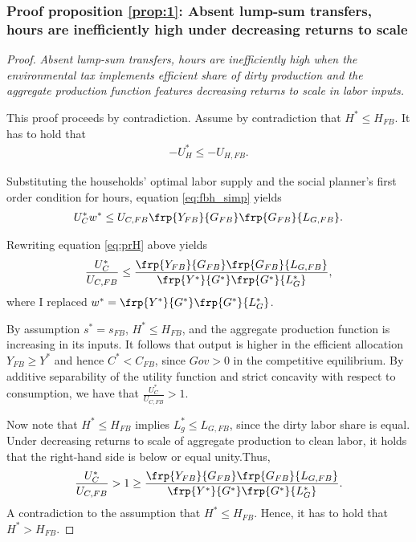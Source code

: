 \subsubsection{Proof proposition \ref{prop:1}: Absent lump-sum transfers, hours are inefficiently high under decreasing returns to scale}\label{app:nolumpsum_hourshigh}
\begin{proof}\textit{Absent lump-sum transfers, hours are inefficiently high when the environmental tax implements efficient share of dirty production and the aggregate production function features decreasing returns to scale in labor inputs.}
	
	This proof proceeds by contradiction. 
	Assume by contradiction that $H^*\leq H_{FB}$. 
	It has to hold that 
	\begin{align}
	-U_H^*\leq -U_{H,FB}.
	\end{align} 
	
	Substituting the households' optimal labor supply and the social planner's first order condition for hours, equation \ref{eq:fbh_simp} yields
	\begin{align}\label{eq:prH}
	U_C^*w^* \leq U_{C,FB}\frp{Y_{FB}}{G_{FB}}\frp{G_{FB}}{L_{G,FB}}.
	\end{align}
	
	Rewriting equation \ref{eq:prH} above yields
	\begin{align}
	\frac{U_C^*}{U_{C,FB}}\leq \frac{\frp{Y_{FB}}{G_{FB}}\frp{G_{FB}}{L_{G,FB}}}{\frp{Y^*}{G^*}\frp{G^*}{L^*_{G}}},
	\end{align}
	where I replaced $w^*=\frp{Y^*}{G^*}\frp{G^*}{L^*_{G}}$.
	
	By assumption $s^*=s_{FB}$, $H^*\leq H_{FB}$, and the aggregate production function is increasing in its inputs. It follows that output is higher in the efficient allocation $Y_{FB}\geq Y^*$ and hence $C^*<C_{FB}$, since $Gov>0$ in the competitive equilibrium. By additive separability of the utility function and strict concavity with respect to consumption, we have that $\frac{U_C^*}{U_{C,FB}}>1$.
	
	Now note that $H^*\leq H_{FB}$ implies  $L_g^*\leq L_{G,FB}$, since the dirty labor share is equal. Under decreasing returns to scale of aggregate production to clean labor, it holds that the right-hand side is below or equal unity.Thus,
	\begin{align}
	\frac{U_C^*}{U_{C,FB}}>1\geq \frac{\frp{Y_{FB}}{G_{FB}}\frp{G_{FB}}{L_{G,FB}}}{\frp{Y^*}{G^*}\frp{G^*}{L^*_{G}}}. 
	\end{align}
	A contradiction to the assumption that $H^*\leq H_{FB}$. Hence, it has to hold that $H^*>H_{FB}$. 
\end{proof}


